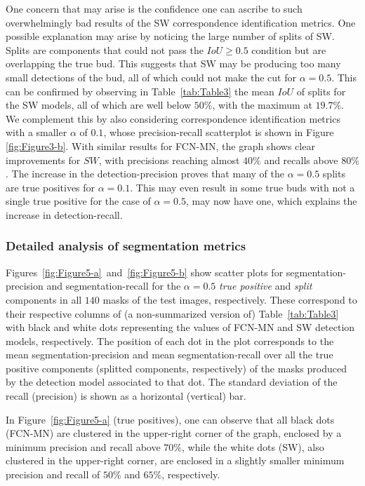 \documentclass[a4paper,authoryear,review]{elsarticle}
\begin{document}
One concern that may arise is the confidence one can ascribe to such overwhelmingly bad results of the SW correspondence identification metrics. One possible explanation may arise by noticing the large number of splits of SW. Splits are components that could not pass the $IoU \geq 0.5$ condition but are overlapping the true bud. This suggests that SW may be producing too many small detections of the bud, all of which could not make the cut for $\alpha=0.5$. This can be confirmed by observing in Table~\ref{tab:Table3} the mean $IoU$ of splits for the SW models, all of which are well below $50\%$, with the maximum at $19.7\%$. We complement this by also considering correspondence identification metrics with a smaller $\alpha$ of $0.1$, whose precision-recall scatterplot is  shown in Figure \ref{fig:Figure3-b}. With similar results for  FCN-MN, the graph shows clear improvements for $SW$, with precisions reaching almost $40\%$ and recalls above $80\%$. 
%
The increase in the detection-precision proves that many of the $\alpha=0.5$ splits are true positives for $\alpha=0.1$. This may even result in some true buds with not a single true positive for the case of $\alpha=0.5$, may now have one, which explains  the increase in detection-recall.


\subsubsection{Detailed analysis of segmentation metrics}

Figures~\ref{fig:Figure5-a}~and~\ref{fig:Figure5-b} show scatter plots for segmentation-precision and segmentation-recall for the $\alpha=0.5$ \emph{true positive} and \emph{split} components in all $140$ masks of the test images, respectively. These correspond to their respective columns of (a non-summarized version of) Table~\ref{tab:Table3} with black and white dots representing the values of FCN-MN and SW detection models, respectively. The position of each dot in the plot corresponds to the mean segmentation-precision and mean segmentation-recall over all the true positive components (splitted components, respectively) of the masks produced by the detection model associated to that dot. The standard deviation of the recall (precision) is shown as a horizontal (vertical) bar.

In Figure~\ref{fig:Figure5-a} (true positives), one can observe that all black dots (FCN-MN) are clustered in the upper-right corner of the graph, enclosed by a minimum precision and recall above $70\%$, while the white dots (SW), also clustered in the upper-right corner, are enclosed in a slightly smaller minimum precision and recall of $50\%$ and $65\%$, respectively. 
\end{document}
